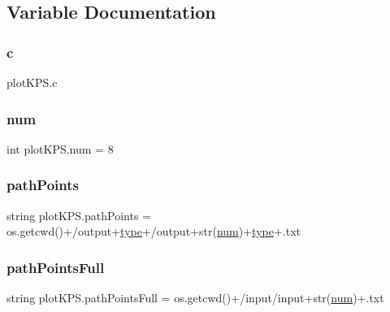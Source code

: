 \subsection{Variable Documentation}
\mbox{\label{namespaceplotKPS_ac5170bd98bd37eefaafd02ca9e4afddb}} 
\subsubsection{\texorpdfstring{c}{c}}
{\footnotesize\ttfamily plot\+K\+P\+S.\+c}

\mbox{\label{namespaceplotKPS_a7d067860f384d4514b73bb9d364df084}} 
\subsubsection{\texorpdfstring{num}{num}}
{\footnotesize\ttfamily int plot\+K\+P\+S.\+num = 8}

\mbox{\label{namespaceplotKPS_a67510e87215a8d35ba91887dad2ce7c0}} 
\subsubsection{\texorpdfstring{path\+Points}{pathPoints}}
{\footnotesize\ttfamily string plot\+K\+P\+S.\+path\+Points = os.\+getcwd()+\textquotesingle{}/output\textquotesingle{}+\hyperlink{namespaceplotKPS_a6f353d1e228ea6b30f24563026ecb40c}{type}+\textquotesingle{}/output\textquotesingle{}+str(\hyperlink{namespaceplotKPS_a7d067860f384d4514b73bb9d364df084}{num})+\hyperlink{namespaceplotKPS_a6f353d1e228ea6b30f24563026ecb40c}{type}+\textquotesingle{}.txt\textquotesingle{}}

\mbox{\label{namespaceplotKPS_abff4301b2725775317d29ad1956d8cc3}} 
\subsubsection{\texorpdfstring{path\+Points\+Full}{pathPointsFull}}
{\footnotesize\ttfamily string plot\+K\+P\+S.\+path\+Points\+Full = os.\+getcwd()+\textquotesingle{}/input/input\textquotesingle{}+str(\hyperlink{namespaceplotKPS_a7d067860f384d4514b73bb9d364df084}{num})+\textquotesingle{}.txt\textquotesingle{}}

